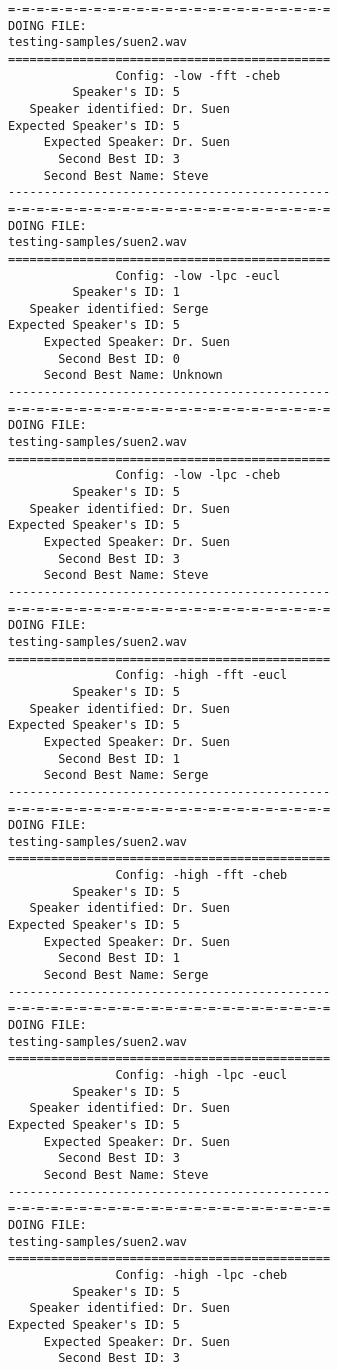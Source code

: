 \begin{verbatim}
=-=-=-=-=-=-=-=-=-=-=-=-=-=-=-=-=-=-=-=-=-=-=
DOING FILE:
testing-samples/suen2.wav
=============================================
               Config: -low -fft -cheb
         Speaker's ID: 5
   Speaker identified: Dr. Suen
Expected Speaker's ID: 5
     Expected Speaker: Dr. Suen
       Second Best ID: 3
     Second Best Name: Steve
---------------------------------------------
=-=-=-=-=-=-=-=-=-=-=-=-=-=-=-=-=-=-=-=-=-=-=
DOING FILE:
testing-samples/suen2.wav
=============================================
               Config: -low -lpc -eucl
         Speaker's ID: 1
   Speaker identified: Serge
Expected Speaker's ID: 5
     Expected Speaker: Dr. Suen
       Second Best ID: 0
     Second Best Name: Unknown
---------------------------------------------
=-=-=-=-=-=-=-=-=-=-=-=-=-=-=-=-=-=-=-=-=-=-=
DOING FILE:
testing-samples/suen2.wav
=============================================
               Config: -low -lpc -cheb
         Speaker's ID: 5
   Speaker identified: Dr. Suen
Expected Speaker's ID: 5
     Expected Speaker: Dr. Suen
       Second Best ID: 3
     Second Best Name: Steve
---------------------------------------------
=-=-=-=-=-=-=-=-=-=-=-=-=-=-=-=-=-=-=-=-=-=-=
DOING FILE:
testing-samples/suen2.wav
=============================================
               Config: -high -fft -eucl
         Speaker's ID: 5
   Speaker identified: Dr. Suen
Expected Speaker's ID: 5
     Expected Speaker: Dr. Suen
       Second Best ID: 1
     Second Best Name: Serge
---------------------------------------------
=-=-=-=-=-=-=-=-=-=-=-=-=-=-=-=-=-=-=-=-=-=-=
DOING FILE:
testing-samples/suen2.wav
=============================================
               Config: -high -fft -cheb
         Speaker's ID: 5
   Speaker identified: Dr. Suen
Expected Speaker's ID: 5
     Expected Speaker: Dr. Suen
       Second Best ID: 1
     Second Best Name: Serge
---------------------------------------------
=-=-=-=-=-=-=-=-=-=-=-=-=-=-=-=-=-=-=-=-=-=-=
DOING FILE:
testing-samples/suen2.wav
=============================================
               Config: -high -lpc -eucl
         Speaker's ID: 5
   Speaker identified: Dr. Suen
Expected Speaker's ID: 5
     Expected Speaker: Dr. Suen
       Second Best ID: 3
     Second Best Name: Steve
---------------------------------------------
=-=-=-=-=-=-=-=-=-=-=-=-=-=-=-=-=-=-=-=-=-=-=
DOING FILE:
testing-samples/suen2.wav
=============================================
               Config: -high -lpc -cheb
         Speaker's ID: 5
   Speaker identified: Dr. Suen
Expected Speaker's ID: 5
     Expected Speaker: Dr. Suen
       Second Best ID: 3

\end{verbatim}
